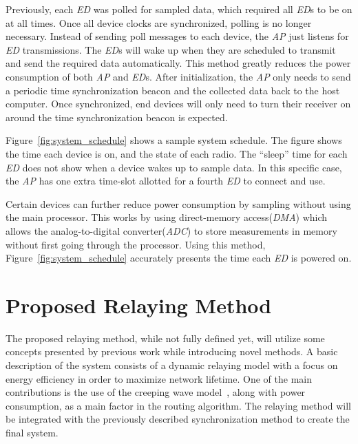 \documentclass{article}
\begin{document}
Previously, each \emph{ED} was polled for sampled data, which required all \emph{ED}s to be on at all times. Once all device clocks are synchronized, polling is no longer necessary. Instead of sending poll messages to each device, the \emph{AP} just listens for \emph{ED} transmissions. The \emph{ED}s will wake up when they are scheduled to transmit and send the required data automatically. This method greatly reduces the power consumption of both \emph{AP} and \emph{ED}s. After initialization, the \emph{AP} only needs to send a periodic time synchronization beacon and the collected data back to the host computer. Once synchronized, end devices will only need to turn their receiver on around the time synchronization beacon is expected.

Figure~\ref{fig:system_schedule} shows a sample system schedule. The figure shows the time each device is on, and the state of each radio. The ``sleep'' time for each \emph{ED} does not show when a device wakes up to sample data. In this specific case, the \emph{AP} has one extra time-slot allotted for a fourth \emph{ED} to connect and use.

Certain devices can further reduce power consumption by sampling without using the main processor. This works by using direct-memory access(\emph{DMA}) which allows the analog-to-digital converter(\emph{ADC}) to store measurements in memory without first going through the processor. Using this method, Figure~\ref{fig:system_schedule} accurately presents the time each \emph{ED} is powered on.

\section{Proposed Relaying Method}\label{section:relaying}
The proposed relaying method, while not fully defined yet, will utilize some concepts presented by previous work while introducing novel methods. A basic description of the system consists of a dynamic relaying model with a focus on energy efficiency in order to maximize network lifetime. One of the main contributions is the use of the creeping wave model~\cite{relay:creepingwave}, along with power consumption, as a main factor in the routing algorithm. The relaying method will be integrated with the previously described synchronization method to create the final system.

%

{}

\end{document}
